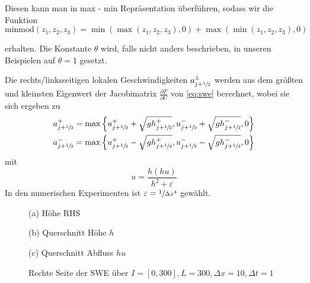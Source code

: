 Diesen kann man in max - min Repräsentation überführen, sodass wir die Funktion
 \begin{equation}
\text{minmod}(z_1,z_2,z_3) = \min(\max(z_1,z_2,z_3),0) + \max(\min(z_1,z_2,z_3),0)    
 \end{equation}

erhalten. Die Konstante $\theta$ wird, falls nicht anders beschrieben, in unseren Beispielen auf $\theta=1$ gesetzt.

Die rechts/linksseitigen lokalen Geschwindigkeiten $a^\pm_{j+\sfrac{1}{2}}$ werden aus dem größten und kleinsten Eigenwert der Jacobimatrix $\frac{\partial F}{\partial U}$ von \eqref{eq:swe} berechnet, wobei sie sich ergeben zu
\[
 \begin{aligned}
 a^+_{j+\sfrac{1}{2}} &= \max \left\lbrace u^+_{j+\sfrac{1}{2}} + \sqrt{gh^+_{j+\sfrac{1}{2}}},u^-_{j+\sfrac{1}{2}} + \sqrt{gh^-_{j+\sfrac{1}{2}}},0\right\rbrace\\
 a^-_{j+\sfrac{1}{2}} &= \max \left\lbrace u^+_{j+\sfrac{1}{2}} - \sqrt{gh^+_{j+\sfrac{1}{2}}},u^-_{j+\sfrac{1}{2}} - \sqrt{gh^-_{j+\sfrac{1}{2}}},0\right\rbrace
 \end{aligned}
\]
mit \begin{equation}
u=\frac{h(hu)}{h^2 + \varepsilon}
\label{eq:sweHuToU}
    \end{equation}
In den numerischen Experimenten ist $\varepsilon = \sfrac{1}{\Delta x^4}$ gewählt.
\begin{figure}
\footnotesize
\centering
\begin{minipage}[b]{\linewidth}

\caption*{(a) Höhe RHS}
\end{minipage}
\begin{minipage}[b]{0.49\linewidth}

\caption*{(b) Querschnitt Höhe $h$}
\end{minipage}
\begin{minipage}[b]{0.49\linewidth}

\caption*{(c) Querschnitt Abfluss $hu$}
\end{minipage}
\caption{Rechte Seite der SWE über $I=[0,300], L=300, \Delta x=10, \Delta t = 1$}
\label{fig:sweGrad}
\end{figure}


